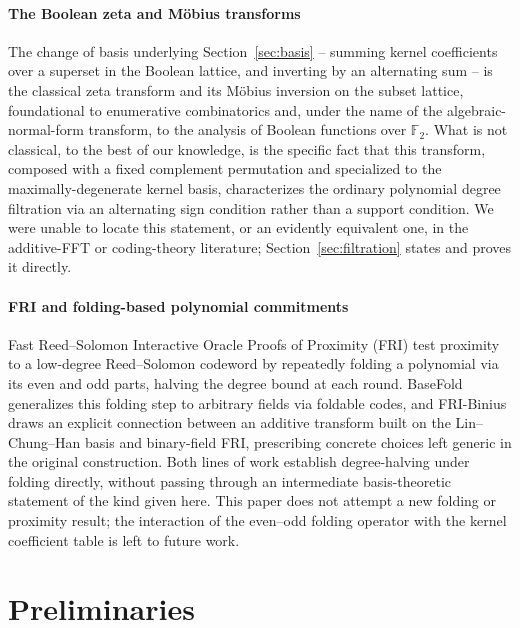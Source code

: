 \documentclass[preprint,3p,12pt,numbers]{elsarticle}
\theoremstyle{definition}
\theoremstyle{remark}
\begin{document}
\paragraph{The Boolean zeta and M\"obius transforms}
The change of basis underlying Section~\ref{sec:basis} -- summing kernel
coefficients over a superset in the Boolean lattice, and inverting by an
alternating sum -- is the classical zeta transform and its M\"obius
inversion on the subset lattice, foundational to enumerative combinatorics
and, under the name of the algebraic-normal-form transform, to the
analysis of Boolean functions over $\mathbb{F}_2$. What is not classical,
to the best of our knowledge, is the specific fact that this transform,
composed with a fixed complement permutation and specialized to the
maximally-degenerate kernel basis, characterizes the ordinary polynomial
degree filtration via an alternating sign condition rather than a support
condition. We were unable to locate this statement, or an evidently
equivalent one, in the additive-FFT or coding-theory literature;
Section~\ref{sec:filtration} states and proves it directly.

\paragraph{FRI and folding-based polynomial commitments}
Fast Reed--Solomon Interactive Oracle Proofs of Proximity (FRI)
\citep{BenSassonEtAl2018FRI} test proximity to a low-degree Reed--Solomon
codeword by repeatedly folding a polynomial via its even and odd parts,
halving the degree bound at each round. BaseFold
\citep{ZeilbergerChenFisch2024Basefold} generalizes this folding step to
arbitrary fields via foldable codes, and FRI-Binius
\citep{DiamondPosen2026FRIBinius} draws an explicit connection between an
additive transform built on the Lin--Chung--Han basis and binary-field
FRI, prescribing concrete choices left generic in the original
construction. Both lines of work establish degree-halving under folding
directly, without passing through an intermediate basis-theoretic
statement of the kind given here. This paper does not attempt a new folding or proximity result; the interaction of the even--odd folding operator with the kernel coefficient table is left to future work.

\section{Preliminaries}
\label{sec:prelim}
\end{document}
